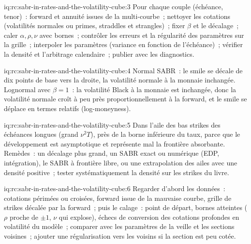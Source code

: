 \begin{solution}{iq:rc:sabr-in-rates-and-the-volatility-cube:3}
Pour chaque couple (échéance, tenor)~: forward et annuité issues de la multi-courbe~; nettoyer les
cotations (volatilités normales ou primes, straddles et strangles)~; fixer $\beta$ et le
décalage~; caler $\alpha,\rho,\nu$ avec bornes~; contrôler les erreurs et la régularité des
paramètres sur la grille~; interpoler les paramètres (variance en fonction de l'échéance)~;
vérifier la densité et l'arbitrage calendaire~; publier avec les diagnostics.
\end{solution}

\begin{solution}{iq:rc:sabr-in-rates-and-the-volatility-cube:4}
Normal SABR~: le smile se décale de dix points de base vers la droite, la volatilité normale à la
monnaie inchangée. Lognormal avec $\beta=1$~: la volatilité Black à la monnaie est inchangée, donc la
volatilité normale croît à peu près proportionnellement à la forward, et le smile se déplace en
termes relatifs (log-moneyness).
\end{solution}

\begin{solution}{iq:rc:sabr-in-rates-and-the-volatility-cube:5}
Dans l'aile des bas strikes des échéances longues (grand $\nu^2T$), près de la borne inférieure
du taux, parce que le développement est asymptotique et représente mal la frontière absorbante.
Remèdes~: un décalage plus grand, un SABR exact ou numérique (EDP, intégration), le SABR à
frontière libre, ou une extrapolation des ailes avec une densité positive~; tester
systématiquement la densité sur les strikes du livre.
\end{solution}

\begin{solution}{iq:rc:sabr-in-rates-and-the-volatility-cube:6}
Regarder d'abord les données~: cotations périmées ou croisées, forward issue de la mauvaise
courbe, grille de strikes décalée par la forward~; puis le calage~: point de départ, bornes
atteintes ($\rho$ proche de $\pm1$, $\nu$ qui explose), échecs de conversion des cotations
profondes en volatilité du modèle~; comparer avec les paramètres de la veille et les sections
voisines~; ajouter une régularisation vers les voisins si la section est peu cotée.
\end{solution}
